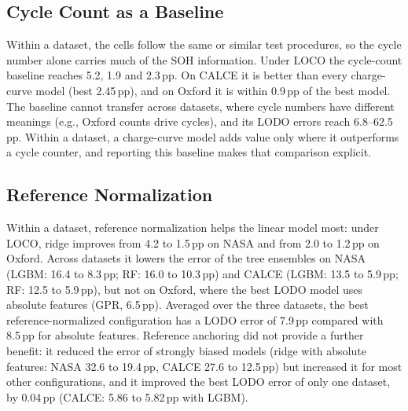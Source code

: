 \documentclass[conference]{IEEEtran}
\begin{document}
\subsection{Cycle Count as a Baseline}
Within a dataset, the cells follow the same or similar test procedures, so the cycle number alone carries much of the SOH information. Under LOCO the cycle-count baseline reaches 5.2, 1.9 and 2.3\,pp. On CALCE it is better than every charge-curve model (best 2.45\,pp), and on Oxford it is within 0.9\,pp of the best model. The baseline cannot transfer across datasets, where cycle numbers have different meanings (e.g., Oxford counts drive cycles), and its LODO errors reach 6.8--62.5\,pp. Within a dataset, a charge-curve model adds value only where it outperforms a cycle counter, and reporting this baseline makes that comparison explicit.

\subsection{Reference Normalization}
Within a dataset, reference normalization helps the linear model most: under LOCO, ridge improves from 4.2 to 1.5\,pp on NASA and from 2.0 to 1.2\,pp on Oxford. Across datasets it lowers the error of the tree ensembles on NASA (LGBM: 16.4 to 8.3\,pp; RF: 16.0 to 10.3\,pp) and CALCE (LGBM: 13.5 to 5.9\,pp; RF: 12.5 to 5.9\,pp), but not on Oxford, where the best LODO model uses absolute features (GPR, 6.5\,pp). Averaged over the three datasets, the best reference-normalized configuration has a LODO error of 7.9\,pp compared with 8.5\,pp for absolute features. Reference anchoring did not provide a further benefit: it reduced the error of strongly biased models (ridge with absolute features: NASA 32.6 to 19.4\,pp, CALCE 27.6 to 12.5\,pp) but increased it for most other configurations, and it improved the best LODO error of only one dataset, by 0.04\,pp (CALCE: 5.86 to 5.82\,pp with LGBM).
\end{document}
